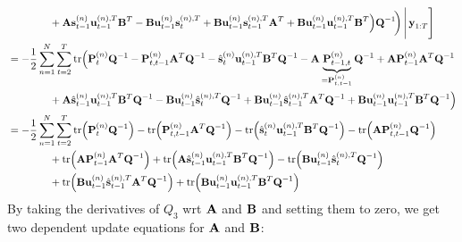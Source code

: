\begin{align*}
					&\qquad\qquad + \mat{A} \vec{s}_{t - 1}^{(n)} \vec{u}_{t - 1}^{(n), T} \mat{B}^T - \mat{B} \vec{u}_{t - 1}^{(n)} \vec{s}_t^{(n), T} + \mat{B} \vec{u}_{t - 1}^{(n)} \vec{s}_{t - 1}^{(n), T} \mat{A}^T + \mat{B} \vec{u}_{t - 1}^{(n)} \vec{u}_{t - 1}^{(n), T} \mat{B}^T\Big) \mat{Q}^{-1} \!\bigg) \Bigggiven \vec{y}_{1:T} \Bigg] \\
				&= -\frac{1}{2} \sum_{n = 1}^{N} \sum_{t = 2}^{T} \tr\!\Big( \mat{P}_t^{(n)} \mat{Q}^{-1} - \mat{P}_{t, t - 1}^{(n)} \mat{A}^T \mat{Q}^{-1} - \hat{\vec{s}}_t^{(n)} \vec{u}_{t - 1}^{(n), T} \mat{B}^T \mat{Q}^{-1} - \mat{A} \underbrace{\mat{P}_{t - 1, t}^{(n)}}_{= \mat{P}_{t, t - 1}^{(n)}} \mat{Q}^{-1} + \mat{A} \mat{P}_{t - 1}^{(n)} \mat{A}^T \mat{Q}^{-1} \\
					&\qquad\qquad + \mat{A} \hat{\vec{s}}_{t - 1}^{(n)} \vec{u}_{t - 1}^{(n), T} \mat{B}^T \mat{Q}^{-1} - \mat{B} \vec{u}_{t - 1}^{(n)} \hat{\vec{s}}_t^{(n), T} \mat{Q}^{-1} + \mat{B} \vec{u}_{t - 1}^{(n)} \hat{\vec{s}}_{t - 1}^{(n), T} \mat{A}^T \mat{Q}^{-1} + \mat{B} \vec{u}_{t - 1}^{(n)} \vec{u}_{t - 1}^{(n), T} \mat{B}^T \mat{Q}^{-1} \Big) \\
				&= -\frac{1}{2} \sum_{n = 1}^{N} \sum_{t = 2}^{T} \tr\!\Big( \mat{P}_t^{(n)} \mat{Q}^{-1} \Big) - \tr\!\Big( \mat{P}_{t, t - 1}^{(n)} \mat{A}^T \mat{Q}^{-1} \Big) - \tr\!\Big( \hat{\vec{s}}_t^{(n)} \vec{u}_{t - 1}^{(n), T} \mat{B}^T \mat{Q}^{-1} \Big) - \tr\!\Big( \mat{A} \mat{P}_{t, t - 1}^{(n)} \mat{Q}^{-1} \Big) \\
					&\qquad\qquad + \tr\!\Big( \mat{A} \mat{P}_{t - 1}^{(n)} \mat{A}^T \mat{Q}^{-1} \Big) + \tr\!\Big( \mat{A} \hat{\vec{s}}_{t - 1}^{(n)} \vec{u}_{t - 1}^{(n), T} \mat{B}^T \mat{Q}^{-1} \Big) - \tr\!\Big( \mat{B} \vec{u}_{t - 1}^{(n)} \hat{\vec{s}}_t^{(n), T} \mat{Q}^{-1} \Big) \\
					&\qquad\qquad + \tr\!\Big( \mat{B} \vec{u}_{t - 1}^{(n)} \hat{\vec{s}}_{t - 1}^{(n), T} \mat{A}^T \mat{Q}^{-1} \Big) + \tr\!\Big( \mat{B} \vec{u}_{t - 1}^{(n)} \vec{u}_{t - 1}^{(n), T} \mat{B}^T \mat{Q}^{-1} \Big) \\
		\end{align*}
		By taking the derivatives of \(Q_3\) \ac{wrt} \(\boldsymbol{\mathrm{A}}\) and \(\boldsymbol{\mathrm{B}}\) and setting them to zero, we get two dependent update equations for \(\boldsymbol{\mathrm{A}}\) and \(\boldsymbol{\mathrm{B}}\):

